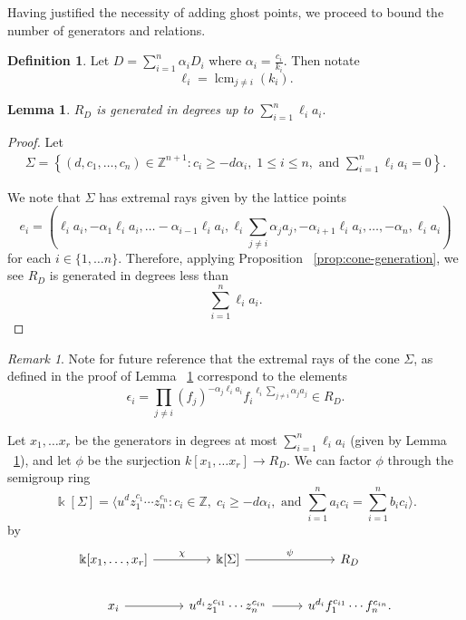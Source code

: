 \documentclass{amsart}
\theoremstyle{plain}
\newtheorem{lem}[thm]{Lemma}
\theoremstyle{definition}
\newtheorem{defn}[thm]{Definition}
\theoremstyle{remark}
\newtheorem{rem}[thm]{Remark}
\numberwithin{equation}{section}
\newcommand\bz{{\mathbb Z}}
\newcommand\bk{{\Bbbk}}
\newcommand\bida{a}
\newcommand\bidb{b}
\DeclareMathOperator{\lcm}{lcm}
\begin{document}
Having justified the necessity of adding ghost points, we proceed to bound the
number of generators and relations.

\begin{defn}\label{def:ell_i}
Let $D = \sum_{i=1}^n \alpha_i D_i$ where $\alpha_i = \frac{c_i}{k_i}$.
Then notate
\[\ell_i = \lcm_{j\ne i}(k_i).\]
\end{defn}

\begin{lem} \label{lem:proj-generators}
$R_D$ is generated in degrees up to $\sum_{i=1}^n \ell_i a_i.$

\end{lem}
\begin{proof}
Let 
\begin{align}\label{eqn:Sigma-def}
	\Sigma = \left \{(d, c_1, \ldots, c_n) \in \bz^{n+1} : c_i \geq - d
\alpha_i, \; 1 \leq i \leq n, \text{ and } \sum_{i=1}^{n} \ell_i \bida_i = 0
\right \}.
\end{align}

We note that $\Sigma$ has extremal rays given by the lattice points 
\begin{equation}\label{defn:e-i-proj}
	e_i = \left(\ell_i \bida_i, - \alpha_1 \ell_i \bida_i, \ldots
-\alpha_{i-1} \ell_i \bida_i, \ell_i \sum_{j\ne i} \alpha_j \bida_j,
-\alpha_{i+1} \ell_i \bida_i, \ldots, -\alpha_n, \ell_i \bida_i \right)
\end{equation}
for each $i\in \{1, \ldots n\}$.
Therefore, applying Proposition ~\ref{prop:cone-generation}, we see $R_D$ is generated in degrees less than
\[
	\sum_{i=1}^n \ell_i a_i.
\]
\end{proof}

\begin{rem}
\label{rem:pm-extremal-rays}
Note for future reference that the extremal rays of the cone $\Sigma$, as
defined in the proof of Lemma ~\ref{lem:proj-generators} correspond to the
elements
\begin{equation}
\label{eqn:epsilon-def-proj}
	\epsilon_i = \prod_{j\ne i} (f_j)^{-\alpha_j \ell_i a_i} {f_i}^{\ell_i \sum_{j\ne i} \alpha_j a_j}\in R_D.
\end{equation}
\end{rem}



Let $x_1, \ldots x_r$ be the generators in degrees at most $\sum_{i=1}^n \ell_i
\bida_i$ (given by Lemma ~\ref{lem:proj-generators}), and let $\phi$ be the
surjection $k[x_1, \ldots x_r] \to R_D$.  We can factor $\phi$ through the
semigroup ring 
\[
	\bk[\Sigma] =  \langle u^d z_1^{c_1} \cdots z_n^{c_n} : c_i \in
\mathbb{Z}, \; c_i \geq -d \alpha_i, \mbox{ and }\sum_{i=1}^{n} \bida_i c_i =
\sum_{i=1}^{n} \bidb_i c_i \rangle. 
\]
by
\[
\begin{tikzcd}
\bk[x_1,\ldots, x_r] \ar {r}{\chi} & \bk[\Sigma] \ar {r}{\psi} & R_D \\
x_i \ar r & u^{d_i}z_1^{c_{i1}} \cdots z_n^{c_{in}} \ar r & u^{d_i}f_1^{c_{i1}} \cdots f_n^{c_{in}}.
\end{tikzcd}
\]
\end{document}
